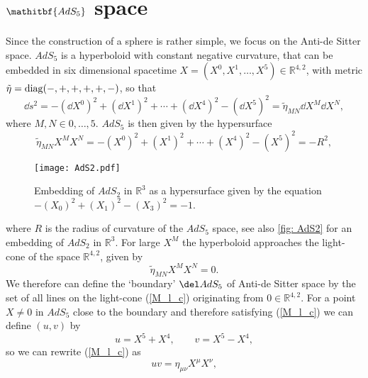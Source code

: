 \section[$\mathrm{AdS_{5}}$ space]{$\mathitbf{AdS_{5}}$ space}\label{AdS5}
Since the construction of a sphere is rather simple, we focus on the Anti-de Sitter space. $AdS_{5}$ is a hyperboloid with constant negative curvature, that can be embedded in six dimensional  spacetime $X = (X^{0},X^{1},\ldots,X^{5}) \in \mathbb{R}^{4,2}$, with metric ${\tilde{\eta} = {\rm diag}(-,+,+,+,+,-)}$, so that
\begin{equation}
\dd s^{2} = -\left(\dd X^{0}\right)^{2} + \left(\dd X^{1}\right)^{2} + \cdots + \left(\dd X^{4}\right)^{2} - \left(\dd X^{5}\right)^{2} = \tilde{\eta}_{MN} \dd X^{M}\dd X^{N},
\end{equation}
where $M,N \in {0,\ldots,5}$. $AdS_{5}$ is then given by the hypersurface
\begin{equation}
\tilde{\eta}_{MN}X^{M}X^{N} = -\left(X^{0}\right)^{2} + \left(X^{1}\right)^{2} + \cdots + \left(X^{4}\right)^{2} - \left(X^{5}\right)^{2} = -R^{2},
\label{hyperbol}
\end{equation}
%
%
\begin{figure}[ht!]
\begin{center}
\texttt{[image: AdS2.pdf]}
\caption{Embedding of $AdS_{2}$ in $\mathbb{R}^{3}$ as a hypersurface given by the equation $-(X_{0})^{2}+(X_{1})^{2}-(X_{3})^{2}=-1$. \label{fig: AdS2}}
\end{center}
\end{figure}
%
%
where $R$ is the radius of curvature of the $AdS_{5}$ space, see also \autoref{fig: AdS2}  for an embedding of $AdS_{2}$ in $\mathbb{R}^{3}$. For large $X^{M}$ the hyperboloid approaches the light-cone of the  space $\mathbb{R}^{4,2}$, given by
\begin{equation}
\tilde{\eta}_{MN}X^{M}X^{N} = 0.
\label{M_l_c}
\end{equation}
We therefore can define the `boundary' $\del AdS_{5}$ of Anti-de Sitter space by the set of all lines on the light-cone (\ref{M_l_c}) originating from $0 \in \mathbb{R}^{4,2}$. For a point $X \neq 0$ in $AdS_{5}$ close to the boundary and therefore satisfying (\ref{M_l_c}) we can define $(u,v)$ by
\begin{equation}
u = X^{5}+X^{4}, \qquad v = X^{5}-X^{4},
\end{equation}
so we can rewrite (\ref{M_l_c}) as
\begin{equation}
uv = \eta_{\mu \nu} X^{\mu}X^{\nu},
\end{equation}
